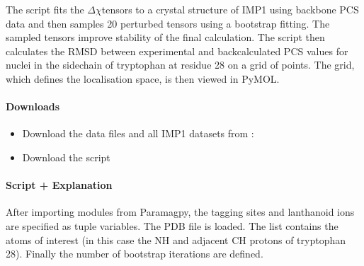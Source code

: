 \documentclass[a4paper,10pt,english,openany,oneside]{sphinxmanual}
\begin{document}
\sphinxAtStartPar
The script fits the \({\Delta\chi}\)\sphinxhyphen{}tensors to a crystal structure of IMP\sphinxhyphen{}1 using backbone PCS data and then samples 20 perturbed tensors using a bootstrap fitting. The sampled tensors improve stability of the final calculation. The script then calculates the RMSD between experimental and back\sphinxhyphen{}calculated PCS values for nuclei in the sidechain of tryptophan at residue 28 on a grid of points. The grid, which defines the localisation space, is then viewed in PyMOL.


\paragraph{Downloads}
\label{\detokenize{examples/pcs_fit_atom:downloads}}\begin{itemize}
\item {} 
\sphinxAtStartPar
Download the data files  and all IMP\sphinxhyphen{}1 datasets from :

\item {} 
\sphinxAtStartPar
Download the script 

\end{itemize}


\paragraph{Script + Explanation}
\label{\detokenize{examples/pcs_fit_atom:script-explanation}}
\sphinxAtStartPar
After importing modules from Paramagpy, the tagging sites and lanthanoid ions are specified as tuple variables. The PDB file is loaded. The  list contains the atoms of interest (in this case the NH and adjacent CH protons of tryptophan 28). Finally the number of bootstrap iterations are defined.
\end{document}
